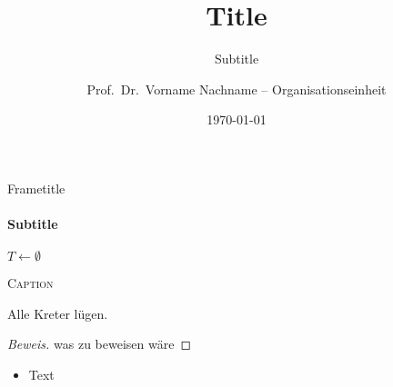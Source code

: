 \documentclass{vorlesung}
\title[\textcolor{black}{shorttitle}]{Title}
\subtitle{Subtitle}
\date[2023]{\today}
\author[Nachname et~al.]{Prof.\ Dr.\ Vorname Nachname -- Organisationseinheit}
\begin{document}
\begin{frame}
\titlepage
\end{frame}
\begin{frame}{Frametitle}
\framesubtitle{Subtitle}
\begin{algorithm}[H]
\DontPrintSemicolon
{}
$T \gets \emptyset$\;
\caption{\textsc{Caption}}
\end{algorithm}
\begin{theorem}
Alle Kreter lügen.
\end{theorem}
\begin{proof}[Beweis]
was zu beweisen wäre
\end{proof}
\begin{itemize}
	\item Text
\end{itemize}
\end{frame}
\end{document}
